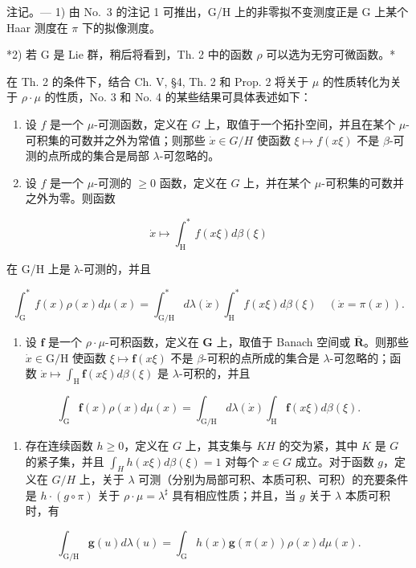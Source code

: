 注记。--- 1) 由 No.~3 的注记 1 可推出，G/H 上的非零拟不变测度正是 G 上某个 Haar 测度在 \(\pi\) 下的拟像测度。

*2) 若 G 是 Lie 群，稍后将看到，Th. 2 中的函数 \(\rho\) 可以选为无穷可微函数。*

在 Th. 2 的条件下，结合 Ch. V, §4, Th. 2 和 Prop. 2 将关于 \(\mu\) 的性质转化为关于 \(\rho \cdot \mu\) 的性质，No. 3 和 No. 4 的某些结果可具体表述如下：

\begin{enumerate}
\def\labelenumi{\alph{enumi})}
\item
  设 \(f\) 是一个 \(\mu\)-可测函数，定义在 \(G\) 上，取值于一个拓扑空间，并且在某个 \(\mu\)-可积集的可数并之外为常值；则那些 \(\dot{x} \in G / H\) 使函数 \(\xi \mapsto f(x\xi)\) 不是 \(\beta\)-可测的点所成的集合是局部 \(\lambda\)-可忽略的。
\item
  设 \(f\) 是一个 \(\mu\)-可测的 \(\geqslant 0\) 函数，定义在 \(G\) 上，并在某个 \(\mu\)-可积集的可数并之外为零。则函数
\end{enumerate}

\[
\dot {x} \mapsto \int_ {\mathrm{H}} ^ {*} f (x \xi) d \beta (\xi)
\]

在 G/H 上是 λ-可测的，并且

\[
\int_ {\mathrm{G}} ^ {*} f (x) \rho (x) d \mu (x) = \int_ {\mathrm{G} / \mathrm{H}} ^ {*} d \lambda (\dot {x}) \int_ {\mathrm{H}} ^ {*} f (x \xi) d \beta (\xi) \quad (\dot {x} = \pi (x)).
\]

\begin{enumerate}
\def\labelenumi{\alph{enumi})}
\setcounter{enumi}{2}
\tightlist
\item
  设 \(\mathbf{f}\) 是一个 \(\rho \cdot \mu\)-可积函数，定义在 \(\mathbf{G}\) 上，取值于 Banach 空间或 \(\overline{\mathbf{R}}\)。则那些 \(\dot{x} \in \mathrm{G} / \mathrm{H}\) 使函数 \(\xi \mapsto \mathbf{f}(x\xi)\) 不是 \(\beta\)-可积的点所成的集合是 \(\lambda\)-可忽略的；函数 \(\dot{x} \mapsto \int_{\mathrm{H}} \mathbf{f}(x\xi) d\beta(\xi)\) 是 \(\lambda\)-可积的，并且
\end{enumerate}

\[
\int_ {\mathrm{G}} \mathbf {f} (x) \rho (x) d \mu (x) = \int_ {\mathrm{G/H}} d \lambda (\dot {x}) \int_ {\mathrm{H}} \mathbf {f} (x \xi) d \beta (\xi).
\]

\begin{enumerate}
\def\labelenumi{\alph{enumi})}
\setcounter{enumi}{3}
\tightlist
\item
  存在连续函数 \(h \geqslant 0\)，定义在 \(G\) 上，其支集与 \(KH\) 的交为紧，其中 \(K\) 是 \(G\) 的紧子集，并且 \(\int_{H} h(x\xi) d\beta(\xi) = 1\) 对每个 \(x \in G\) 成立。对于函数 \(g\)，定义在 \(G/H\) 上，关于 \(\lambda\) 可测（分别为局部可积、本质可积、可积）的充要条件是 \(h \cdot (g \circ \pi)\) 关于 \(\rho \cdot \mu = \lambda^{\sharp}\) 具有相应性质；并且，当 \(g\) 关于 \(\lambda\) 本质可积时，有
\end{enumerate}

\[
\int_ {\mathrm{G/H}} \mathbf {g} (u) d \lambda (u) = \int_ {\mathrm{G}} h (x) \mathbf {g} (\pi (x)) \rho (x) d \mu (x).
\]

